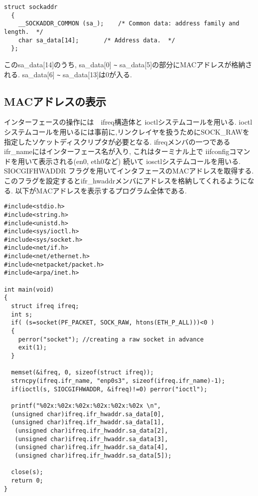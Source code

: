 \documentclass[a4paper]{article}%
\begin{document}
\begin{lstlisting}[caption=sockaddr, label=sockaddr]
struct sockaddr
  {
    __SOCKADDR_COMMON (sa_);	/* Common data: address family and length.  */
    char sa_data[14];		/* Address data.  */
  };
\end{lstlisting}
このsa\_data[14]のうち, sa\_data[0] \verb|~| sa\_data[5]の部分にMACアドレスが格納される. sa\_data[6] \verb|~| sa\_data[13]は0が入る.

\subsection{MACアドレスの表示}
インターフェースの操作には　ifreq構造体と ioctlシステムコールを用いる.
ioctlシステムコールを用いるには事前に,リンクレイヤを扱うためにSOCK\_RAWを指定したソケットディスクリプタが必要となる.
ifreqメンバの一つであるifr\_nameにはインターフェース名が入り, これはターミナル上で iifconfigコマンドを用いて表示される(en0, eth0など)
続いて iosctlシステムコールを用いる.
SIOCGIFHWADDR フラグを用いてインタフェースのMACアドレスを取得する.このフラグを設定するとifr\_hwaddrメンバにアドレスを格納してくれるようになる.
以下がMACアドレスを表示するプログラム全体である.
\begin{lstlisting}[caption=showMACaddress, label=showMACaddress]
#include<stdio.h>
#include<string.h>
#include<unistd.h>
#include<sys/ioctl.h>
#include<sys/socket.h>
#include<net/if.h>
#include<net/ethernet.h>
#include<netpacket/packet.h>
#include<arpa/inet.h>
 
int main(void)
{
  struct ifreq ifreq;
  int s;
  if( (s=socket(PF_PACKET, SOCK_RAW, htons(ETH_P_ALL)))<0 )
  {
    perror("socket"); //creating a raw socket in advance
    exit(1);
  }
  
  memset(&ifreq, 0, sizeof(struct ifreq));
  strncpy(ifreq.ifr_name, "enp0s3", sizeof(ifreq.ifr_name)-1);
  if(ioctl(s, SIOCGIFHWADDR, &ifreq)!=0) perror("ioctl");
 
  printf("%02x:%02x:%02x:%02x:%02x:%02x \n",
  (unsigned char)ifreq.ifr_hwaddr.sa_data[0],
  (unsigned char)ifreq.ifr_hwaddr.sa_data[1],
   (unsigned char)ifreq.ifr_hwaddr.sa_data[2],
   (unsigned char)ifreq.ifr_hwaddr.sa_data[3], 
   (unsigned char)ifreq.ifr_hwaddr.sa_data[4], 
   (unsigned char)ifreq.ifr_hwaddr.sa_data[5]);
  
  close(s);
  return 0;
}
\end{lstlisting}
\end{document}
